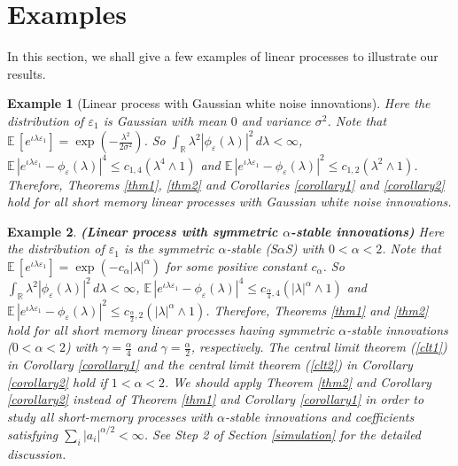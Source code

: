 \documentclass[11pt]{article}
\newtheorem{example}{Example}[section]
\def\R{{\mathbb R}}
\def\E{{{\mathbb E}\,}}
\begin{document}
\bigskip

\section{Examples}\label{example}

In this section, we shall give a few examples of linear processes to illustrate our results.

\begin{example}[Linear process with Gaussian white noise innovations] Here the distribution of $\varepsilon_1$ is Gaussian with mean $0$ and variance $\sigma^2$. Note that $\E[e^{\iota\lambda \varepsilon_1}]=\exp(-\frac{\lambda^2}{2\sigma^2})$. So $\int_{\R}\lambda^2 |\phi_{\varepsilon}(\lambda)|^2\, d\lambda<\infty$, $\E|e^{\iota \lambda \varepsilon_1}-\phi_{\varepsilon}(\lambda)|^{4}\leq c_{1,4} \left(\lambda^4\wedge 1\right)$ and $\E|e^{\iota \lambda \varepsilon_1}-\phi_{\varepsilon}(\lambda)|^{2}\leq c_{1,2} \left(\lambda^{2}\wedge 1\right)$. Therefore, Theorems \ref{thm1}, \ref{thm2} and Corollaries \ref{corollary1} and \ref{corollary2} hold for all short memory linear processes with Gaussian white noise innovations.\end{example}


\begin{example}\label{example2}{\bf (Linear process with symmetric $\alpha$-stable innovations)} Here the distribution of $\varepsilon_1$ is the symmetric $\alpha$-stable (S$\alpha$S) with $0<\alpha<2$. Note that $\E[e^{\iota\lambda \varepsilon_1}]=\exp(-c_{\alpha}|\lambda|^\alpha)$ for some positive constant $c_{\alpha}$. So $\int_{\R}\lambda^2 |\phi_{\varepsilon}(\lambda)|^2\, d\lambda<\infty$, $\E|e^{\iota \lambda \varepsilon_1}-\phi_{\varepsilon}(\lambda)|^{4}\leq c_{\frac{\alpha}{4},4} \left(|\lambda|^{\alpha}\wedge 1\right)$ and $\E|e^{\iota \lambda \varepsilon_1}-\phi_{\varepsilon}(\lambda)|^{2}\leq c_{\frac{\alpha}{2},2} \left(|\lambda|^{\alpha}\wedge 1\right)$. Therefore, Theorems \ref{thm1} and \ref{thm2} hold for all short memory linear processes having symmetric $\alpha$-stable innovations ($0<\alpha<2$) with $\gamma=\frac{\alpha}{4}$ and $\gamma=\frac{\alpha}{2}$, respectively.  
The central limit theorem (\ref{clt1}) in Corollary \ref{corollary1} and the central limit theorem (\ref{clt2}) in Corollary \ref{corollary2} hold if $1<\alpha<2$. We should apply Theorem \ref{thm2} and Corollary \ref{corollary2} instead of Theorem \ref{thm1} and Corollary \ref{corollary1}  in order to study all short-memory processes with $\alpha$-stable innovations and coefficients satisfying $\sum_i |a_i|^{\alpha/2}<\infty$. See Step 2 of Section \ref{simulation} for the detailed discussion.  
\end{example}
\end{document}

